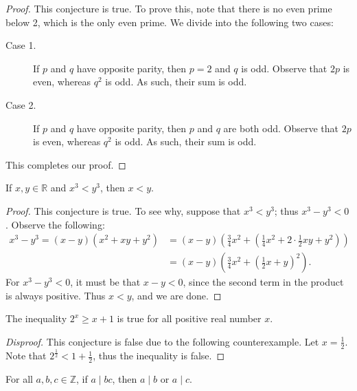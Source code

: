 \documentclass{exam}
\begin{document}
\begin{proof}
    This conjecture is true. To prove this, note that there is no even prime below 2, which is the only even prime. We divide into the following two cases:
    \begin{description}
        \item[Case 1. ] If $p$ and $q$ have opposite parity, then $p=2$ and $q$ is odd. Observe that $2p$ is even, whereas $q^2$ is odd. As such, their sum is odd.
        \item[Case 2. ] If $p$ and $q$ have opposite parity, then $p$ and $q$ are both odd. Observe that $2p$ is even, whereas $q^2$ is odd. As such, their sum is odd.
    \end{description}
    This completes our proof.
\end{proof}

\begin{conjecture}{9.23}
    If $x,y\in\mathbb R$ and $x^3 < y^3$, then $x < y$.
\end{conjecture}

\begin{proof}
    This conjecture is true. To see why, suppose that $x^3 < y^3$; thus $x^3 - y^3 < 0$. Observe the following:
    \begin{align*}
        x^3-y^3 = (x-y)(x^2+xy+y^2) &= (x-y)\left(\frac34x^2+\left(\frac14x^2 + 2\cdot\frac12xy+y^2\right)\right)\\
        &=(x-y)\left(\frac34x^2+\left(\frac12x+y\right)^2\right).
    \end{align*}
    For $x^3-y^3 < 0$, it must be that $x - y < 0$, since the second term in the product is always positive. Thus $x<y$, and we are done.
\end{proof}

\begin{conjecture}{9.24}
    The inequality $2^x\ge x+1$ is true for all positive real number $x$.
\end{conjecture}

\begin{proof}[Disproof]
    This conjecture is false due to the following counterexample. Let $x = \frac12$. Note that $2^\frac12 < 1 + \frac12$, thus the inequality is false.
\end{proof}

\begin{conjecture}{9.25}
    For all $a, b, c\in\mathbb Z$, if $a\mid bc$, then $a\mid b$ or $a\mid c$.
\end{conjecture}
\end{document}
